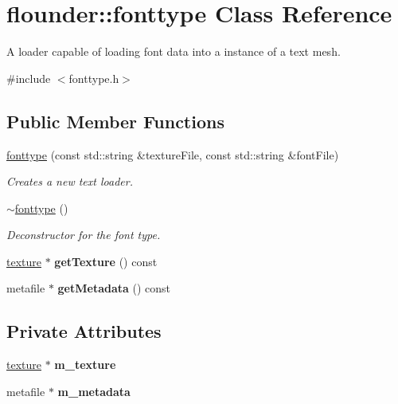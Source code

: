 \hypertarget{classflounder_1_1fonttype}{}\section{flounder\+:\+:fonttype Class Reference}
\label{classflounder_1_1fonttype}


A loader capable of loading font data into a instance of a text mesh.  




{\ttfamily \#include $<$fonttype.\+h$>$}

\subsection*{Public Member Functions}
\begin{DoxyCompactItemize}
\item 
\hyperlink{classflounder_1_1fonttype_a2f0a1a364c9bc3160b54f9187975fc9d}{fonttype} (const std\+::string \&texture\+File, const std\+::string \&font\+File)
\begin{DoxyCompactList}\small\item\em Creates a new text loader. \end{DoxyCompactList}\item 
\hyperlink{classflounder_1_1fonttype_a666d1dbc560c0c308dab930e62a3332f}{$\sim$fonttype} ()
\begin{DoxyCompactList}\small\item\em Deconstructor for the font type. \end{DoxyCompactList}\item 
\mbox{\label{classflounder_1_1fonttype_a6a9f2ff9a6acf704fcf2799ebfcaddcf}} 
\hyperlink{classflounder_1_1texture}{texture} $\ast$ {\bfseries get\+Texture} () const
\item 
\mbox{\label{classflounder_1_1fonttype_a49433f3a7ceca00af02a524237ec3269}} 
metafile $\ast$ {\bfseries get\+Metadata} () const
\end{DoxyCompactItemize}
\subsection*{Private Attributes}
\begin{DoxyCompactItemize}
\item 
\mbox{\label{classflounder_1_1fonttype_a47e73e1a27530d3d4136fa6c69e26502}} 
\hyperlink{classflounder_1_1texture}{texture} $\ast$ {\bfseries m\+\_\+texture}
\item 
\mbox{\label{classflounder_1_1fonttype_a4abe1ae3fe2a4080920c9fb8e4341d06}} 
metafile $\ast$ {\bfseries m\+\_\+metadata}
\end{DoxyCompactItemize}


